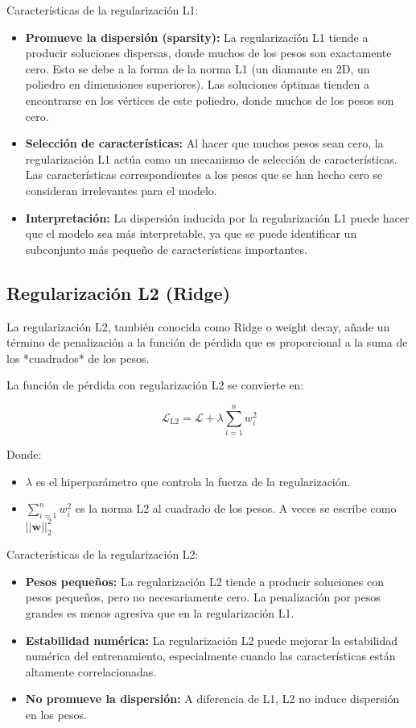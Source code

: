 \documentclass{article}
\begin{document}
Características de la regularización L1:

\begin{itemize}
    \item \textbf{Promueve la dispersión (sparsity):}  La regularización L1 tiende a producir soluciones dispersas, donde muchos de los pesos son exactamente cero.  Esto se debe a la forma de la norma L1 (un diamante en 2D, un poliedro en dimensiones superiores).  Las soluciones óptimas tienden a encontrarse en los vértices de este poliedro, donde muchos de los pesos son cero.
    \item \textbf{Selección de características:}  Al hacer que muchos pesos sean cero, la regularización L1 actúa como un mecanismo de selección de características.  Las características correspondientes a los pesos que se han hecho cero se consideran irrelevantes para el modelo.
    \item \textbf{Interpretación:}  La dispersión inducida por la regularización L1 puede hacer que el modelo sea más interpretable, ya que se puede identificar un subconjunto más pequeño de características importantes.
\end{itemize}

\subsection{Regularización L2 (Ridge)}

La regularización L2, también conocida como Ridge o weight decay, añade un término de penalización a la función de pérdida que es proporcional a la suma de los *cuadrados* de los pesos.

La función de pérdida con regularización L2 se convierte en:

\[
\mathcal{L}_{\text{L2}} = \mathcal{L} + \lambda \sum_{i=1}^{n} w_i^2
\]

Donde:

\begin{itemize}
    \item \(\lambda\) es el hiperparámetro que controla la fuerza de la regularización.
    \item  \(\sum_{i=1}^{n} w_i^2\) es la norma L2 al cuadrado de los pesos. A veces se escribe como \( ||\mathbf{w}||_2^2 \)
\end{itemize}

Características de la regularización L2:

\begin{itemize}
    \item \textbf{Pesos pequeños:} La regularización L2 tiende a producir soluciones con pesos pequeños, pero no necesariamente cero.  La penalización por pesos grandes es menos agresiva que en la regularización L1.
    \item \textbf{Estabilidad numérica:} La regularización L2 puede mejorar la estabilidad numérica del entrenamiento, especialmente cuando las características están altamente correlacionadas.
    \item \textbf{No promueve la dispersión:} A diferencia de L1, L2 no induce dispersión en los pesos.
\end{itemize}
\end{document}
